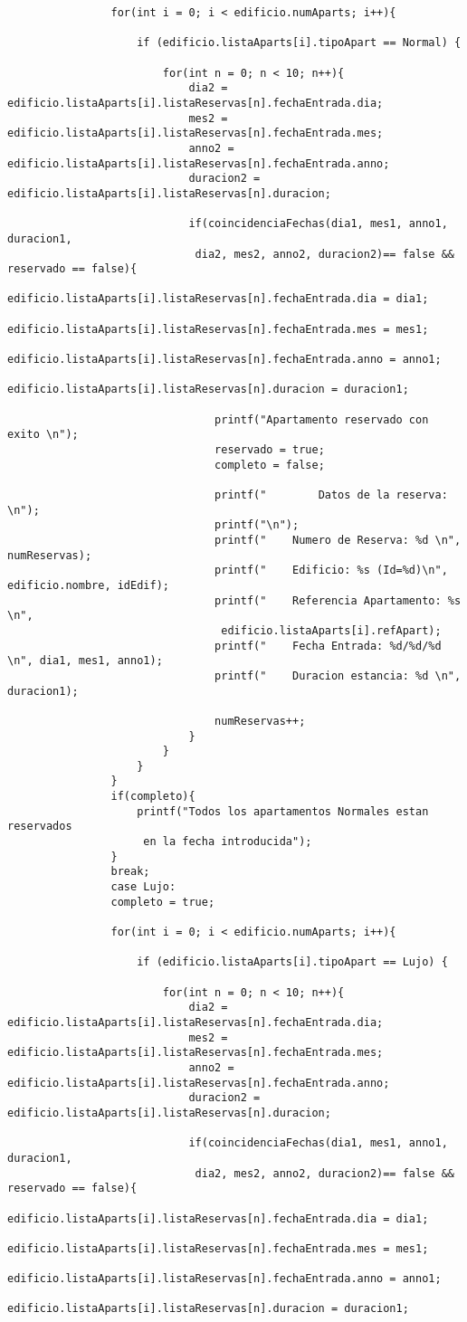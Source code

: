\documentclass[12pt]{article}
\begin{document}
\begin{lstlisting}
				for(int i = 0; i < edificio.numAparts; i++){
					
					if (edificio.listaAparts[i].tipoApart == Normal) {
						
						for(int n = 0; n < 10; n++){
							dia2 = edificio.listaAparts[i].listaReservas[n].fechaEntrada.dia;
							mes2 = edificio.listaAparts[i].listaReservas[n].fechaEntrada.mes;
							anno2 = edificio.listaAparts[i].listaReservas[n].fechaEntrada.anno;
							duracion2 = edificio.listaAparts[i].listaReservas[n].duracion;
							
							if(coincidenciaFechas(dia1, mes1, anno1, duracion1,
							 dia2, mes2, anno2, duracion2)== false && reservado == false){
								edificio.listaAparts[i].listaReservas[n].fechaEntrada.dia = dia1;
								edificio.listaAparts[i].listaReservas[n].fechaEntrada.mes = mes1;
								edificio.listaAparts[i].listaReservas[n].fechaEntrada.anno = anno1;
								edificio.listaAparts[i].listaReservas[n].duracion = duracion1;
								
								printf("Apartamento reservado con exito \n");
								reservado = true;
								completo = false;
								
								printf("        Datos de la reserva: \n");
								printf("\n");
								printf("    Numero de Reserva: %d \n", numReservas);
								printf("    Edificio: %s (Id=%d)\n", edificio.nombre, idEdif);
								printf("    Referencia Apartamento: %s \n",
								 edificio.listaAparts[i].refApart);
								printf("    Fecha Entrada: %d/%d/%d \n", dia1, mes1, anno1);
								printf("    Duracion estancia: %d \n", duracion1);
								
								numReservas++;
							}
						}
					}
				}
				if(completo){
					printf("Todos los apartamentos Normales estan reservados
					 en la fecha introducida");
				}
				break;
				case Lujo:
				completo = true;
				
				for(int i = 0; i < edificio.numAparts; i++){
					
					if (edificio.listaAparts[i].tipoApart == Lujo) {
						
						for(int n = 0; n < 10; n++){
							dia2 = edificio.listaAparts[i].listaReservas[n].fechaEntrada.dia;
							mes2 = edificio.listaAparts[i].listaReservas[n].fechaEntrada.mes;
							anno2 = edificio.listaAparts[i].listaReservas[n].fechaEntrada.anno;
							duracion2 = edificio.listaAparts[i].listaReservas[n].duracion;
							
							if(coincidenciaFechas(dia1, mes1, anno1, duracion1,
							 dia2, mes2, anno2, duracion2)== false && reservado == false){
								edificio.listaAparts[i].listaReservas[n].fechaEntrada.dia = dia1;
								edificio.listaAparts[i].listaReservas[n].fechaEntrada.mes = mes1;
								edificio.listaAparts[i].listaReservas[n].fechaEntrada.anno = anno1;
								edificio.listaAparts[i].listaReservas[n].duracion = duracion1;
								

\end{lstlisting}
\end{document}
